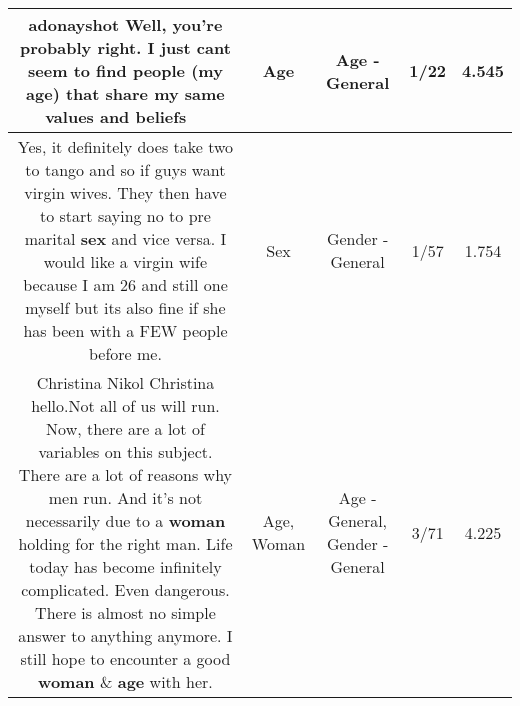 \documentclass[11pt]{article}
\newlength\mylength
\begin{document}
\begin{center}
\begin{longtable}{|C{.65\mylength}|C{.30\mylength}|C{.12\mylength}|C{.12\mylength}|C{.12\mylength}|}
  \small adonayshot Well, you're probably right.  I just cant seem to find people (my \textbf{age}) that share my same values and beliefs 🤷🏽‍♀️\normalsize   & Age & Age - General & 1/22 & 4.545 \\  \hline
  \small Yes, it definitely does take two to tango and so if guys want virgin wives. They then have to start saying no to pre marital \textbf{sex} and vice versa. I would like a virgin wife because I am 26 and still one myself but its also fine if she has been with a FEW people before me.\normalsize   & Sex & Gender - General & 1/57 & 1.754 \\  \hline
  \small Christina Nikol Christina hello.Not all of us will run. Now, there are a lot of variables on this subject. There are a lot of reasons why men run. And it's not necessarily due to a \textbf{woman} holding for the right man. Life today has become infinitely complicated. Even dangerous. There is almost no simple answer to anything anymore. I still hope to encounter a good \textbf{woman} \& \textbf{age} with her.\normalsize   & Age, Woman & Age - General, Gender - General & 3/71 & 4.225 \\  \hline

\end{longtable}
\end{center}
\end{document}
